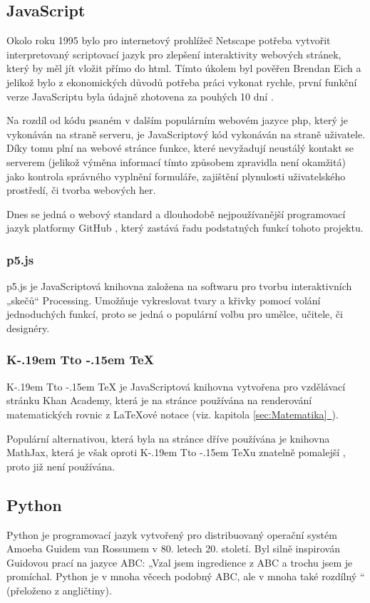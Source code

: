 \documentclass[a4paper, 12pt]{article}
\makeatletter
\newcommand*{\fullref}[1]{\hyperref[{#1}]{\ref*{#1}~\nameref*{#1}}}
\DeclareRobustCommand{\KaTeX}{%
  K\kern -.19em
  {\sbox \z@ T\vbox to\ht \z@ {\hbox{%
  \check@mathfonts
  \fontsize\sf@size\z@
  \selectfont A}%
  \vss}%
}\kern -.15em
\TeX}
\makeatother
\begin{document}
  \subsection{JavaScript} \label{sec:JavaScript}
  Okolo roku 1995 bylo pro internetový prohlížeč Netscape potřeba vytvořit interpretovaný scriptovací jazyk pro zlepšení interaktivity webových stránek, který by měl jít vložit přímo do \gls{html}. Tímto úkolem byl pověřen Brendan Eich a jelikož bylo z ekonomických důvodů potřeba práci vykonat rychle, první funkční verze JavaScriptu byla údajně zhotovena za pouhých 10 dní \cite{the-origin-of-javascript}.

  Na rozdíl od kódu psaném v dalším populárním webovém jazyce \gls{php}, který je vykonáván na straně serveru, je JavaScriptový kód vykonáván na straně uživatele. Díky tomu plní na webové stránce funkce, které nevyžadují neustálý kontakt se serverem (jelikož výměna informací tímto způsobem zpravidla není okamžitá) jako kontrola správného vyplnění formuláře, zajištění plynulosti uživatelského prostředí, či tvorba webových her.

  Dnes se jedná o webový standard a dlouhodobě nejpoužívanější programovací jazyk platformy GitHub \cite{github-statistics}, který zastává řadu podstatných funkcí tohoto projektu.


  \subsubsection{p5.js} \label{sec:p5.js}
  p5.js je JavaScriptová knihovna založena na softwaru pro tvorbu interaktivních „skečů“ Processing. Umožňuje vykreslovat tvary a křivky pomocí volání jednoduchých funkcí, proto se jedná o populární volbu pro umělce, učitele, či designéry.


  \subsubsection{\texorpdfstring{\KaTeX}{KaTeX}} \label{sec:KaTeX}
  \KaTeX{} je JavaScriptová knihovna vytvořena pro vzdělávací stránku Khan Academy, která je na stránce používána na renderování matematických rovnic z \LaTeX ové notace (viz. kapitola \fullref{sec:Matematika}).

  Populární alternativou, která byla na stránce dříve používána je knihovna MathJax, která je však oproti \KaTeX u znatelně pomalejší \cite{katex-mathjax-comparison}, proto již není používána.


  \subsection{Python} \label{sec:Python}
  Python je programovací jazyk vytvořený pro distribuovaný operační systém Amoeba Guidem van Rossumem v 80. letech 20. století. Byl silně inspirován Guidovou prací na jazyce ABC: „Vzal jsem ingredience z ABC a trochu jsem je promíchal. Python je v mnoha věcech podobný ABC, ale v mnoha také rozdílný \cite{making-of-python}“ (přeloženo z angličtiny).
\end{document}
